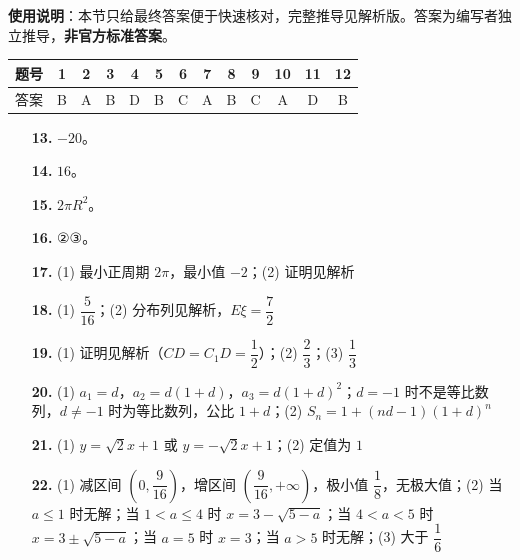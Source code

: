 
\begin{gknotice}
\textbf{使用说明}：本节只给最终答案便于快速核对，完整推导见解析版。答案为编写者独立推导，\textbf{非官方标准答案}。
\end{gknotice}

\begin{center}\begin{tabular}{ccccccccccccc}
\toprule
题号 & 1 & 2 & 3 & 4 & 5 & 6 & 7 & 8 & 9 & 10 & 11 & 12 \\
\midrule
答案 & B & A & B & D & B & C & A & B & C & A & D & B \\
\bottomrule
\end{tabular}\end{center}

\begin{itemize}[leftmargin=2.6em]
  \item[\textbf{13.}] $-20$。
  \item[\textbf{14.}] $16$。
  \item[\textbf{15.}] $2\pi R^2$。
  \item[\textbf{16.}] ②③。
\end{itemize}

\begin{itemize}[leftmargin=2.6em]
  \item[\textbf{17.}] (1) 最小正周期 $2\pi$，最小值 $-2$；(2) 证明见解析
  \item[\textbf{18.}] (1) $\dfrac{5}{16}$；(2) 分布列见解析，$E\xi=\dfrac72$
  \item[\textbf{19.}] (1) 证明见解析（$CD=C_1D=\dfrac12$）；(2) $\dfrac23$；(3) $\dfrac13$
  \item[\textbf{20.}] (1) $a_1=d$，$a_2=d(1+d)$，$a_3=d(1+d)^2$；$d=-1$ 时不是等比数列，$d\neq-1$ 时为等比数列，公比 $1+d$；(2) $S_n=1+(nd-1)(1+d)^n$
  \item[\textbf{21.}] (1) $y=\sqrt2x+1$ 或 $y=-\sqrt2x+1$；(2) 定值为 $1$
  \item[\textbf{22.}] (1) 减区间 $\left(0,\dfrac{9}{16}\right)$，增区间 $\left(\dfrac{9}{16},+\infty\right)$，极小值 $\dfrac18$，无极大值；(2) 当 $a\leqslant1$ 时无解；当 $1<a\leqslant4$ 时 $x=3-\sqrt{5-a}$；当 $4<a<5$ 时 $x=3\pm\sqrt{5-a}$；当 $a=5$ 时 $x=3$；当 $a>5$ 时无解；(3) 大于 $\dfrac16$
\end{itemize}
